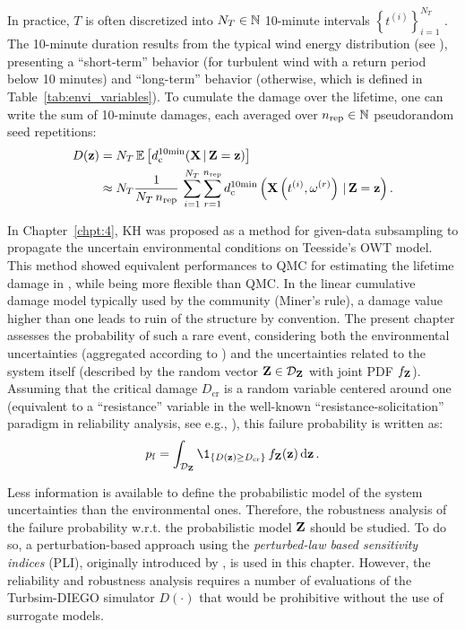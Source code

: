 In practice, $T$ is often discretized into $N_T \in \mathbb{N}$ 10-minute intervals $\left\{t^{(i)}\right\}_{i=1}^{N_T}$ \citep[Appendix H]{iec_2019}. 
The 10-minute duration results from the typical wind energy distribution (see ), presenting a ``short-term'' behavior (for turbulent wind with a return period below 10 minutes) and ``long-term'' behavior (otherwise, which is defined in Table~\ref{tab:envi_variables}).
To cumulate the damage over the lifetime, one can write the sum of 10-minute damages, each averaged over $n_{\mathrm{rep}} \in \mathbb{N}$ pseudorandom seed repetitions: 
\begin{subequations}
    \begin{align}
        D({\bf z}) &= N_T \, \mathbb{E}\left[d_{\mathrm{c}}^{10\mathrm{min}}({\bf X}\,|\,{\bf Z}={\bf z})\right]\\
             & \approx N_T \frac{1}{N_T \, n_{\mathrm{rep}}} \, \sum_{i=1}^{N_T} \sum_{r=1}^{n_{\mathrm{rep}}} d_{\mathrm{c}}^{10\mathrm{min}}\left({\bf X}\left(t^{(i)}, \omega^{(r)}\right)\,|\,{\bf Z}={\bf z}\right).
             \label{eq:expected_damage}
    \end{align}
\end{subequations}

In Chapter~\ref{chpt:4}, KH was proposed as a method for given-data subsampling to propagate the uncertain environmental conditions on Teesside's OWT model. 
This method showed equivalent performances to QMC for estimating the lifetime damage in , while being more flexible than QMC. 
In the linear cumulative damage model typically used by the community (Miner's rule), a damage value higher than one leads to ruin of the structure by convention. 
The present chapter assesses the probability of such a rare event, considering both the environmental uncertainties (aggregated according to ) and the uncertainties related to the system itself (described by the random vector ${\bf Z} \in \mathcal{D}_{\bf Z}$ with joint PDF $f_{\bf Z}$). 
Assuming that the critical damage $D_{\mathrm{cr}}$ is a random variable centered around one (equivalent to a ``resistance'' variable in the well-known ``resistance-solicitation'' paradigm in reliability analysis, see e.g., \citealp{lemaire_2009}), this failure probability is written as:
\begin{equation}
    \pf = \int_{\iD_\bZ} \1_{\{D(\bz) \geq D_{\mathrm{cr}}\}} \, f_\bZ(\bz) \, \dd \bz \,.
    \label{eq:owt_pf}
\end{equation}

Less information is available to define the probabilistic model of the system uncertainties than the environmental ones. 
Therefore, the robustness analysis of the failure probability w.r.t. the probabilistic model ${\bf Z}$ should be studied. 
To do so, a perturbation-based approach using the \textit{perturbed-law based sensitivity indices} (PLI), originally introduced by \citet{lemaitre_2015_PLI}, is used in this chapter.   
However, the reliability and robustness analysis requires a number of evaluations of the Turbsim-DIEGO simulator $D(\cdot)$ that would be prohibitive without the use of surrogate models. 

